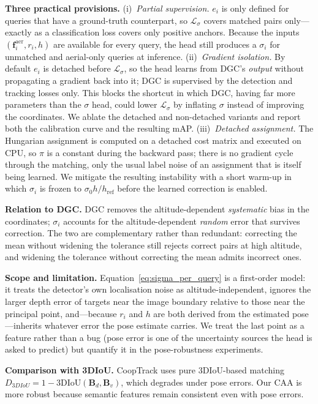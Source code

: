 \documentclass[9.5pt,twocolumn,a4paper]{IEEEtran}
\def\mb#1{\mathbf{#1}}
\begin{document}
\noindent\textbf{Three practical provisions.} (i)~\emph{Partial supervision.} $e_i$ is only defined for queries that have a ground-truth counterpart, so $\mathcal{L}_\sigma$ covers matched pairs only---exactly as a classification loss covers only positive anchors. Because the inputs $(\mb{f}_i^{\text{aer}}, r_i, h)$ are available for every query, the head still produces a $\sigma_i$ for unmatched and aerial-only queries at inference. (ii)~\emph{Gradient isolation.} By default $e_i$ is detached before $\mathcal{L}_\sigma$, so the head learns from DGC's \emph{output} without propagating a gradient back into it; DGC is supervised by the detection and tracking losses only. This blocks the shortcut in which DGC, having far more parameters than the $\sigma$ head, could lower $\mathcal{L}_\sigma$ by inflating $\sigma$ instead of improving the coordinates. We ablate the detached and non-detached variants and report both the calibration curve and the resulting mAP. (iii)~\emph{Detached assignment.} The Hungarian assignment is computed on a detached cost matrix and executed on CPU, so $\pi$ is a constant during the backward pass; there is no gradient cycle through the matching, only the usual label noise of an assignment that is itself being learned. We mitigate the resulting instability with a short warm-up in which $\sigma_i$ is frozen to $\sigma_0 h/h_{\text{ref}}$ before the learned correction is enabled.

\noindent\textbf{Relation to DGC.} DGC removes the altitude-dependent \emph{systematic} bias in the coordinates; $\sigma_i$ accounts for the altitude-dependent \emph{random} error that survives correction. The two are complementary rather than redundant: correcting the mean without widening the tolerance still rejects correct pairs at high altitude, and widening the tolerance without correcting the mean admits incorrect ones.

\noindent\textbf{Scope and limitation.} Equation~\ref{eq:sigma_per_query} is a first-order model: it treats the detector's own localisation noise as altitude-independent, ignores the larger depth error of targets near the image boundary relative to those near the principal point, and---because $r_i$ and $h$ are both derived from the estimated pose---inherits whatever error the pose estimate carries. We treat the last point as a feature rather than a bug (pose error is one of the uncertainty sources the head is asked to predict) but quantify it in the pose-robustness experiments.

\textbf{Comparison with 3DIoU.} CoopTrack uses pure 3DIoU-based matching $D_{3DIoU} = 1 - \text{3DIoU}(\mb{B}_d, \mb{B}_v)$, which degrades under pose errors. Our CAA is more robust because semantic features remain consistent even with pose errors.
\end{document}

